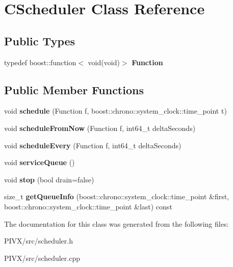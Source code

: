\hypertarget{class_c_scheduler}{}\section{C\+Scheduler Class Reference}
\label{class_c_scheduler}
\subsection*{Public Types}
\begin{DoxyCompactItemize}
\item 
\mbox{\label{class_c_scheduler_af0202f526eeef71defb156dc06f70279}} 
typedef boost\+::function$<$ void(void)$>$ {\bfseries Function}
\end{DoxyCompactItemize}
\subsection*{Public Member Functions}
\begin{DoxyCompactItemize}
\item 
\mbox{\label{class_c_scheduler_a14747dc42599cc0a17f45f1767932d6e}} 
void {\bfseries schedule} (Function f, boost\+::chrono\+::system\+\_\+clock\+::time\+\_\+point t)
\item 
\mbox{\label{class_c_scheduler_ad5faa192176dc51e3c68356589934b7a}} 
void {\bfseries schedule\+From\+Now} (Function f, int64\+\_\+t delta\+Seconds)
\item 
\mbox{\label{class_c_scheduler_ad7fcff70877bf1d84f30c1137bba816f}} 
void {\bfseries schedule\+Every} (Function f, int64\+\_\+t delta\+Seconds)
\item 
\mbox{\label{class_c_scheduler_a14d2800815da93577858ea078aed1fba}} 
void {\bfseries service\+Queue} ()
\item 
\mbox{\label{class_c_scheduler_a328f18f2d0eb9977180c8b091a17947a}} 
void {\bfseries stop} (bool drain=false)
\item 
\mbox{\label{class_c_scheduler_a6cdbfd095e9f7695c09769d4c1b05461}} 
size\+\_\+t {\bfseries get\+Queue\+Info} (boost\+::chrono\+::system\+\_\+clock\+::time\+\_\+point \&first, boost\+::chrono\+::system\+\_\+clock\+::time\+\_\+point \&last) const
\end{DoxyCompactItemize}


The documentation for this class was generated from the following files\+:\begin{DoxyCompactItemize}
\item 
P\+I\+V\+X/src/scheduler.\+h\item 
P\+I\+V\+X/src/scheduler.\+cpp\end{DoxyCompactItemize}
